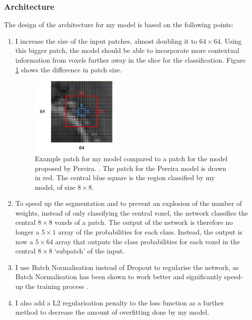 \documentclass[12pt,a4paper,twoside,openright]{report}
\begin{document}
\subsubsection{Architecture}
The design of the architecture for my model is based on the following points:
\begin{enumerate}
	\item I increase the size of the input patches, almost doubling it to $64 \times 64$. Using this bigger patch, the model should be able to incorporate more contextual information from voxels further away in the slice for the classification. Figure \ref{fig:bigger_patches} shows the difference in patch size.
		\begin{figure}
			\centering
			\includegraphics[width=0.4\textwidth]{bigger_patches}
			\caption[Example patch for my model compared to a patch for the model proposed by Pereira.]{Example patch for my model compared to a patch for the model proposed by Pereira. \cite{pereira}. The patch for the Pereira model is drawn in red. The central blue square is the region classified by my model, of size $8 \times 8$.}
			\label{fig:bigger_patches}
		\end{figure}
	\item To speed up the segmentation and to prevent an explosion of the number of weights, instead of only classifying the central voxel, the network classifies the central $8 \times 8$ voxels of a patch. The output of the network is therefore no longer a $5 \times 1$ array of the probabilities for each class. Instead, the output is now a $5 \times 64$ array that outputs the class probabilities for each voxel in the central $8 \times 8$ `subpatch' of the input. 
	\item I use Batch Normalisation instead of Dropout to regularise the network, as Batch Normalisation has been shown to work better and significantly speed-up the training process \cite{batch_normalization}. 
	\item I also add a L2 regularisation penalty to the loss function as a further method to decrease the amount of overfitting done by my model.

\end{enumerate}
\end{document}
